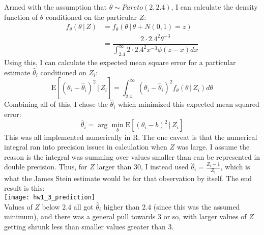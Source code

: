 \documentclass[11pt]{article}
\newcommand{\E}{\mathrm{E}}
\theoremstyle{definition}
\begin{document}
\begin{itemize}
        Armed with the assumption that \(\theta \sim Pareto(2,2.4)\), I can calculate the density function of $\theta$ conditioned on the particular $Z$:
        \begin{align*}
            f_\theta (\theta \,|\, Z) &= f_\theta (\theta \,|\, \theta + N(0,1) = z) \\
                                  &= \dfrac{ 2 \cdot 2.4^2 \theta^{-3}}{\int_{2.4}^\infty 2 \cdot 2.4^2 x^{-3} \phi(z-x) dx}
        \end{align*}
        Using this, I can calculate the expected mean square error for a particular estimate $\hat\theta_i$ conditioned on $Z_i$:
        \[ \E[(\theta_i-\hat\theta_i)^2 \,|\, Z_i] = \int_{2.4}^\infty (\theta_i-\hat\theta_i)^2 f_\theta(\theta \,|\, Z_i) d\theta \]
        Combining all of this, I chose the $\hat\theta_i$ which minimized this expected mean squared error:
        \[\hat\theta_i = \arg\!\min_b \E[(\theta_i-b)^2 \,|\, Z_i] \]
        This was all implemented numerically in R. The one caveat is that the numerical integral ran into precision issues in calculation when $Z$ was large. I assume the reason is the integral was summing over values smaller than can be represented in double precision. Thus, for $Z$ larger than $30$, I instead used \(\hat\theta_i = \frac{Z_i-1}{Z_i} \), which is what the James Stein estimate would be for that observation by itself. The end result is this: \\
        \texttt{[image: hw1\_3\_prediction]} \\
        Values of $Z$ below $2.4$ all got $\hat\theta_i$ higher than $2.4$ (since this was the assumed minimum), and there was a general pull towards $3$ or so, with larger values of $Z$ getting shrunk less than smaller values greater than $3$.


\end{itemize}
\end{document}
